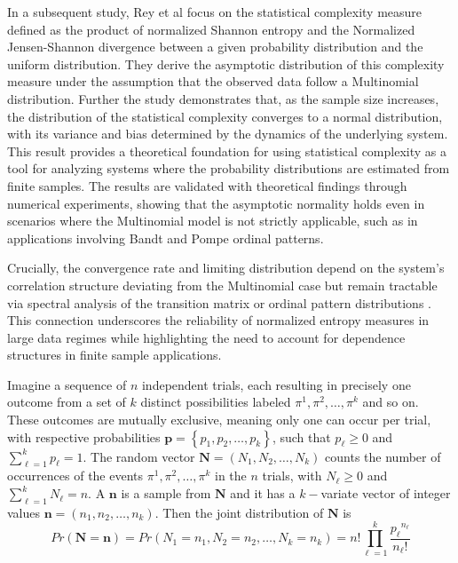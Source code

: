  
In a subsequent study, Rey et al \cite{Rey2025} focus on the statistical complexity measure defined as the product of normalized Shannon entropy and the Normalized Jensen-Shannon divergence between a given probability distribution and the uniform distribution. 
They derive the asymptotic distribution of this complexity measure under the assumption that the observed data follow a Multinomial distribution. Further the study demonstrates that, as the sample size increases, the distribution of the statistical complexity converges to a normal distribution, with its variance and bias determined by the dynamics of the underlying system. This result provides a theoretical foundation for using statistical complexity as a tool for analyzing systems where the probability distributions are estimated from finite samples. The results are validated with theoretical findings through numerical experiments, showing that the asymptotic normality holds even in scenarios where the Multinomial model is not strictly applicable, such as in applications involving Bandt and Pompe ordinal patterns. 

Crucially, the convergence rate and limiting distribution depend on the system’s correlation structure deviating from the Multinomial case but remain tractable via spectral analysis of the transition matrix or ordinal pattern distributions \cite{PhysRevE.103.022215,Chagas2022}. This connection underscores the reliability of normalized entropy measures in large data regimes while highlighting the need to account for dependence structures in finite sample applications.


Imagine a sequence of $n$ independent trials, each resulting in precisely one outcome from a set of $k$ distinct possibilities labeled $\pi^1,\pi^2, \dots, \pi^k$ and so on. These outcomes are mutually exclusive, meaning only one can occur per trial, with respective probabilities $\bm{p}={\left\{p_1,p_2,\dots,p_k\right\}}$, such that $p_\ell \geq 0$ and $\sum^{k}_{\ell=1} {p_\ell =1}.$ The random vector $\bm{N}=(N_1,N_2,\dots, N_k)$ counts the number of occurrences of the events $\pi^1,\pi^2, \dots, \pi^k$ in the $n$ trials, with $N_\ell \geq0$ and $\sum^{k}_{\ell=1} {N_\ell =n}.$ A $\bm{n}$ is a sample from $\bm{N}$ and it has a $k-$variate vector of integer values $\bm{n}=(n_1,n_2,\dots,n_k).$ Then the joint distribution of $\bm{N}$ is 
\begin{equation}
	Pr(\bm{N=n})=Pr(N_1=n_1,N_2=n_2, \dots,N_k=n_k)=n!\prod_{\ell=1}^{k}\frac{{p_\ell}^{n_\ell}}{n_\ell !}
\end{equation}   

